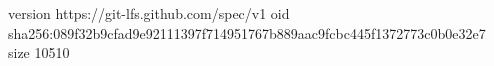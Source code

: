 version https://git-lfs.github.com/spec/v1
oid sha256:089f32b9cfad9e92111397f714951767b889aac9fcbc445f1372773c0b0e32e7
size 10510
